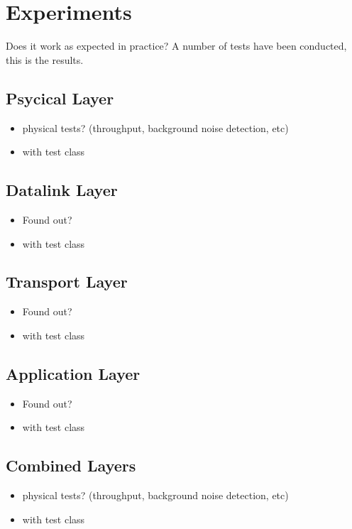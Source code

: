 \chapter{Experiments}\label{chap:experiments}
Does it work as expected in practice?
A number of tests have been conducted, this is the results.
\section{Psycical Layer}

\begin{itemize}
\item physical tests? (throughput, background noise detection, etc)
\item with test class
\end{itemize}

\section{Datalink Layer}

\begin{itemize}
\item Found out?
\item with test class
\end{itemize}

\section{Transport Layer}

\begin{itemize}
\item Found out?
\item with test class
\end{itemize}

\section{Application Layer}

\begin{itemize}
\item Found out?
\item with test class
\end{itemize}

\section{Combined Layers}

\begin{itemize}
\item physical tests? (throughput, background noise detection, etc)
\item with test class
\end{itemize}
